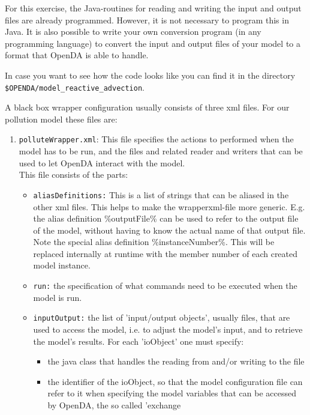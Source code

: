 \documentclass[a4paper,10pt]{article}
\begin{document}
For this exercise, the Java-routines for reading and writing the input and
output files are already programmed. However, it is not necessary to program
this in Java. It is also possible to write your own conversion program (in any
programming language) to convert the input and output files of your model to a
format that OpenDA is able to handle.

In case you want to see how the code looks like you can find it in the directory
{\tt \$OPENDA/model\_reactive\_advection}. 

A black box wrapper configuration usually consists of three xml files. For our
pollution model these files are:
\begin{enumerate}
   \item {\tt polluteWrapper.xml}: This file specifies the actions to performed
     when the model has to be run, and the files and related reader and writers
     that can be used to let OpenDA interact with the model.\\ This file
     consists of the parts:
     \begin{itemize}
        \item {\tt aliasDefinitions:} This is a list of strings that can be
          aliased in the other xml files. This helps to make the
          wrapperxml-file more generic. E.g. the alias definition
          \%outputFile\% can be used to refer to the output file of the model,
          without having to know the actual name of that output file.\\ Note
          the special alias definition \%instanceNumber\%. This will be
          replaced internally at runtime with the member number of each created
          model instance.
        \item {\tt run:} the specification of what commands need to be executed
          when the model is run.
        \item {\tt inputOutput:} the list of 'input/output objects', usually
          files, that are used to access the model, i.e. to adjust the model's
          input, and to retrieve the model's results. For each 'ioObject' one
          must specify:
        \begin{itemize}
           \item the java class that handles the reading from and/or writing to
             the file
           \item the identifier of the ioObject, so that the model
             configuration file can refer to it when specifying the model
             variables that can be accessed by OpenDA, the so called 'exchange

\end{itemize}
\end{itemize}
\end{enumerate}
\end{document}
